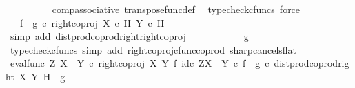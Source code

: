 \begin{isabellebody}
\ \ \ \ \ \ \ \ \isamarkupfalse%
\ comp{\isacharunderscore}{\kern0pt}associative{}\ transpose{\isacharunderscore}{\kern0pt}func{\isacharunderscore}{\kern0pt}def\ \isamarkupfalse%
\ {\isacharparenleft}{\kern0pt}typecheck{\isacharunderscore}{\kern0pt}cfuncs{\isacharcomma}{\kern0pt}\ force{\isacharparenright}{\kern0pt}\isanewline
\ \ \ \ \ \ \isamarkupfalse%
\ \isamarkupfalse%
\ {\isachardoublequoteopen}{\isachardot}{\kern0pt}{\isachardot}{\kern0pt}{\isachardot}{\kern0pt}\ {\isacharequal}{\kern0pt}\ {\isacharparenleft}{\kern0pt}f\isactrlsup {\isasymflat}\ {\isasymamalg}\ g\isactrlsup {\isasymflat}\ {\isasymcirc}\isactrlsub c\ right{\isacharunderscore}{\kern0pt}coproj\ {\isacharparenleft}{\kern0pt}X\ {\isasymtimes}\isactrlsub c\ H{\isacharparenright}{\kern0pt}\ {\isacharparenleft}{\kern0pt}Y\ {\isasymtimes}\isactrlsub c\ H{\isacharparenright}{\kern0pt}{\isacharparenright}{\kern0pt}\isactrlsup {\isasymsharp}{\isachardoublequoteclose}\isanewline
\ \ \ \ \ \ \ \ \isamarkupfalse%
\ {\isacharparenleft}{\kern0pt}simp\ add{\isacharcolon}{\kern0pt}\ dist{\isacharunderscore}{\kern0pt}prod{\isacharunderscore}{\kern0pt}coprod{\isacharunderscore}{\kern0pt}right{\isacharunderscore}{\kern0pt}right{\isacharunderscore}{\kern0pt}coproj{\isacharparenright}{\kern0pt}\isanewline
\ \ \ \ \ \ \isamarkupfalse%
\ \isamarkupfalse%
\ {\isachardoublequoteopen}{\isachardot}{\kern0pt}{\isachardot}{\kern0pt}{\isachardot}{\kern0pt}\ {\isacharequal}{\kern0pt}\ g{\isachardoublequoteclose}\isanewline
\ \ \ \ \ \ \ \ \isamarkupfalse%
\ {\isacharparenleft}{\kern0pt}typecheck{\isacharunderscore}{\kern0pt}cfuncs{\isacharcomma}{\kern0pt}\ simp\ add{\isacharcolon}{\kern0pt}\ right{\isacharunderscore}{\kern0pt}coproj{\isacharunderscore}{\kern0pt}cfunc{\isacharunderscore}{\kern0pt}coprod\ sharp{\isacharunderscore}{\kern0pt}cancels{\isacharunderscore}{\kern0pt}flat{\isacharparenright}{\kern0pt}\isanewline
\ \ \ \ \ \ \isamarkupfalse%
\ \isamarkupfalse%
\ {\isachardoublequoteopen}{\isacharparenleft}{\kern0pt}eval{\isacharunderscore}{\kern0pt}func\ Z\ {\isacharparenleft}{\kern0pt}X\ {\isasymCoprod}\ Y{\isacharparenright}{\kern0pt}\ {\isasymcirc}\isactrlsub c\ right{\isacharunderscore}{\kern0pt}coproj\ X\ Y\ {\isasymtimes}\isactrlsub f\ id\isactrlsub c\ {\isacharparenleft}{\kern0pt}Z\isactrlbsup {\isacharparenleft}{\kern0pt}X\ {\isasymCoprod}\ Y{\isacharparenright}{\kern0pt}\isactrlesup {\isacharparenright}{\kern0pt}{\isacharparenright}{\kern0pt}\isactrlsup {\isasymsharp}\ {\isasymcirc}\isactrlsub c\ {\isacharparenleft}{\kern0pt}f\isactrlsup {\isasymflat}\ {\isasymamalg}\ g\isactrlsup {\isasymflat}\ {\isasymcirc}\isactrlsub c\ dist{\isacharunderscore}{\kern0pt}prod{\isacharunderscore}{\kern0pt}coprod{\isacharunderscore}{\kern0pt}right\ X\ Y\ H{\isacharparenright}{\kern0pt}\isactrlsup {\isasymsharp}\ {\isacharequal}{\kern0pt}\ g{\isachardoublequoteclose}\isacommand{{\isachardot}{\kern0pt}}\isamarkupfalse%

\end{isabellebody}
